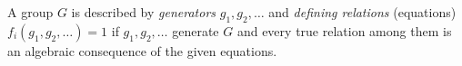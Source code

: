 A group $G$ is described by \textit{generators} $g_1, g_2, \ldots$ and \textit{defining relations} (equations) $f_i(g_1, g_2, \ldots) = 1$ if $g_1, g_2, \ldots$ generate $G$ and every true relation among them is an algebraic consequence of the given equations.
